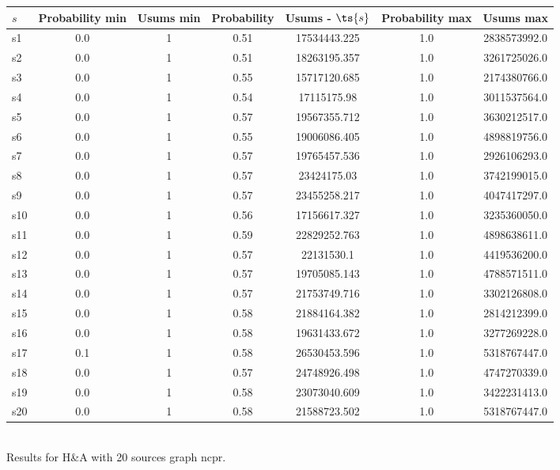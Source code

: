 \documentclass{article}
\begin{document}
\noindent\begin{tabular}{|l|c|c|c|c|c|c|}
\hline
$s$& Probability min & Usums min & Probability & Usums - $\ts{s}$ & Probability max & Usums max\\
\hline
s1 &0.0 & 1 & 0.51 & 17534443.225 & 1.0 & 2838573992.0\\
\hline
s2 &0.0 & 1 & 0.51 & 18263195.357 & 1.0 & 3261725026.0\\
\hline
s3 &0.0 & 1 & 0.55 & 15717120.685 & 1.0 & 2174380766.0\\
\hline
s4 &0.0 & 1 & 0.54 & 17115175.98 & 1.0 & 3011537564.0\\
\hline
s5 &0.0 & 1 & 0.57 & 19567355.712 & 1.0 & 3630212517.0\\
\hline
s6 &0.0 & 1 & 0.55 & 19006086.405 & 1.0 & 4898819756.0\\
\hline
s7 &0.0 & 1 & 0.57 & 19765457.536 & 1.0 & 2926106293.0\\
\hline
s8 &0.0 & 1 & 0.57 & 23424175.03 & 1.0 & 3742199015.0\\
\hline
s9 &0.0 & 1 & 0.57 & 23455258.217 & 1.0 & 4047417297.0\\
\hline
s10 &0.0 & 1 & 0.56 & 17156617.327 & 1.0 & 3235360050.0\\
\hline
s11 &0.0 & 1 & 0.59 & 22829252.763 & 1.0 & 4898638611.0\\
\hline
s12 &0.0 & 1 & 0.57 & 22131530.1 & 1.0 & 4419536200.0\\
\hline
s13 &0.0 & 1 & 0.57 & 19705085.143 & 1.0 & 4788571511.0\\
\hline
s14 &0.0 & 1 & 0.57 & 21753749.716 & 1.0 & 3302126808.0\\
\hline
s15 &0.0 & 1 & 0.58 & 21884164.382 & 1.0 & 2814212399.0\\
\hline
s16 &0.0 & 1 & 0.58 & 19631433.672 & 1.0 & 3277269228.0\\
\hline
s17 &0.1 & 1 & 0.58 & 26530453.596 & 1.0 & 5318767447.0\\
\hline
s18 &0.0 & 1 & 0.57 & 24748926.498 & 1.0 & 4747270339.0\\
\hline
s19 &0.0 & 1 & 0.58 & 23073040.609 & 1.0 & 3422231413.0\\
\hline
s20 &0.0 & 1 & 0.58 & 21588723.502 & 1.0 & 5318767447.0\\
\hline
\end{tabular}\\

\noindent Results for H\&A with 20 sources graph ncpr.
\end{document}
